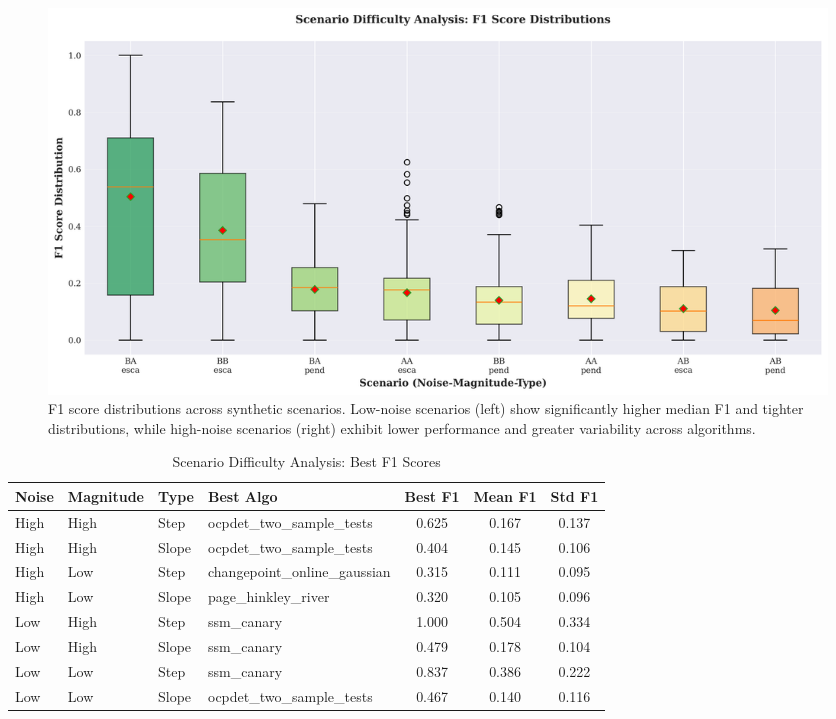 \documentclass[journal,article,submit,pdftex,moreauthors]{Definitions/mdpi}
\begin{document}
\begin{figure}[ht]
\centering
\includegraphics[width=\textwidth]{figures/fig_scenario_difficulty.png}
\caption{F1 score distributions across synthetic scenarios. Low-noise scenarios (left) show significantly higher median F1 and tighter distributions, while high-noise scenarios (right) exhibit lower performance and greater variability across algorithms.}
\label{fig:scenario_difficulty}
\end{figure}

\begin{table}[ht]
\centering
\caption{Scenario Difficulty Analysis: Best F1 Scores}
\label{tab:scenario_matrix}
\small
\begin{tabular}{llllccc}
\toprule
\textbf{Noise} & \textbf{Magnitude} & \textbf{Type} & \textbf{Best Algo} & \textbf{Best F1} & \textbf{Mean F1} & \textbf{Std F1} \\
\midrule
High & High & Step & ocpdet\_two\_sample\_tests & 0.625 & 0.167 & 0.137 \\
High & High & Slope & ocpdet\_two\_sample\_tests & 0.404 & 0.145 & 0.106 \\
High & Low & Step & changepoint\_online\_gaussian & 0.315 & 0.111 & 0.095 \\
High & Low & Slope & page\_hinkley\_river & 0.320 & 0.105 & 0.096 \\
Low & High & Step & ssm\_canary & 1.000 & 0.504 & 0.334 \\
Low & High & Slope & ssm\_canary & 0.479 & 0.178 & 0.104 \\
Low & Low & Step & ssm\_canary & 0.837 & 0.386 & 0.222 \\
Low & Low & Slope & ocpdet\_two\_sample\_tests & 0.467 & 0.140 & 0.116 \\
\bottomrule
\end{tabular}
\end{table}
\end{document}
